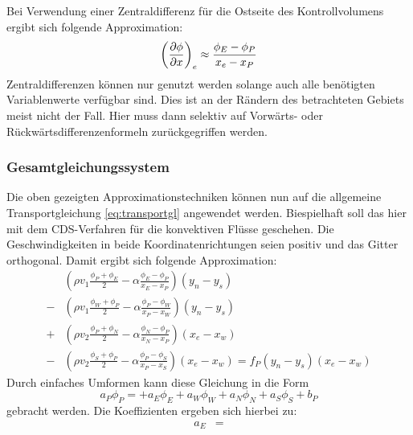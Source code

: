 Bei Verwendung einer Zentraldifferenz für die Ostseite des Kontrollvolumens ergibt sich folgende
Approximation:
\begin{equation}
  \left({\pder[\phi]{x}}\right)_e \approx \frac{\phi_E -\phi_P}{x_e-x_P}
\end{equation}
Zentraldifferenzen können nur genutzt werden solange auch alle benötigten Variablenwerte
verfügbar sind. Dies ist an der Rändern des betrachteten Gebiets meist nicht der Fall.
Hier muss dann selektiv auf Vorwärts- oder Rückwärtsdifferenzenformeln zurückgegriffen werden.


\subsubsection{Gesamtgleichungssystem}

Die oben gezeigten Approximationstechniken können nun auf die allgemeine Transportgleichung
\eqref{eq:transportgl} angewendet werden. Biespielhaft soll das hier mit dem CDS-Verfahren für
die konvektiven Flüsse geschehen. Die Geschwindigkeiten in beide Koordinatenrichtungen seien positiv
und das Gitter orthogonal. Damit ergibt sich folgende Approximation:
\begin{align*}
  &\left({\rho v_1 \frac{\phi_P+\phi_E}{2} - \alpha \frac{\phi_E-\phi_P}{x_E-x_P}}\right) (y_n-y_s)\\
  -&\left({\rho v_1 \frac{\phi_W+\phi_P}{2} - \alpha \frac{\phi_P-\phi_W}{x_P-x_W}}\right) (y_n-y_s)\\
  +&\left({\rho v_2 \frac{\phi_P+\phi_N}{2} - \alpha \frac{\phi_N-\phi_P}{x_N-x_P}}\right) (x_e-x_w)\\
  -&\left({\rho v_2 \frac{\phi_S+\phi_P}{2} - \alpha \frac{\phi_P-\phi_S}{x_P-x_S}}\right) (x_e-x_w)=
  f_P (y_n-y_s)(x_e-x_w)
\end{align*}
Durch einfaches Umformen kann diese Gleichung in die Form
\begin{equation}
  a_P\phi_P = + a_E\phi_E + a_W\phi_W + a_N\phi_N + a_S\phi_S + b_P
\end{equation}
gebracht werden.
Die Koeffizienten ergeben sich hierbei zu:
\begin{align*}
  a_E &=
\end{align*}
